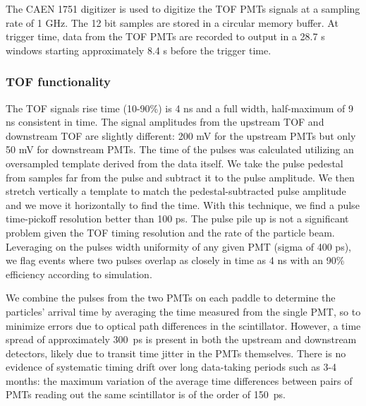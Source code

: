 


The CAEN 1751 digitizer is used to digitize the TOF PMTs signals at a sampling rate of 1 GHz. The 12 bit samples are stored in a circular memory buffer. At trigger time, data from the TOF PMTs are recorded to output in a 28.7 \textmu s windows starting  approximately 8.4 \textmu s before the trigger time. 



\subsubsection{TOF functionality}\label{sec:MWPCfunc}


The TOF signals rise time (10-90\%) is 4 ns and a full width, half-maximum of 9 ns consistent in time. The signal amplitudes from the upstream TOF and  downstream TOF are slightly different:  200 mV for the upstream PMTs but only 50 mV for downstream PMTs. The time of the pulses was calculated utilizing an oversampled template derived from the data itself. We take the pulse pedestal from samples far from the pulse and subtract it to the pulse amplitude. We then stretch vertically a template to match the pedestal-subtracted pulse amplitude and we move it horizontally to find the time. With this technique, we find a pulse time-pickoff resolution better than 100 ps.  The pulse pile up is not a significant problem given the TOF timing resolution and the rate of the particle beam.  Leveraging on the pulses width uniformity of any given PMT (sigma of 400 ps),  we flag events where two pulses overlap as closely in time as 4 ns with an 90\% efficiency according to simulation. 


We combine the pulses from the two PMTs on each paddle to determine the particles' arrival time by averaging the time measured from the single PMT, so to minimize errors due to optical path differences in the scintillator.  However, a time spread of approximately 300~ps is present in both the upstream and downstream detectors, likely due to transit time jitter in the PMTs themselves.  There is no evidence of systematic timing drift over long data-taking periods such as 3-4 months: the maximum variation of the average time differences between pairs of PMTs reading out the same scintillator is of the order of 150~ps.

